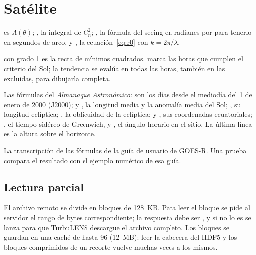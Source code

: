 \section{Satélite}


 es $\Lambda(\theta)$; , la integral de $C_n^2$; , la fórmula del seeing en
radianes por  para tenerlo en segundos de arco, y , la ecuación~\eqref{eq:r0} con $k = 2\pi/\lambda$.


 con grado 1 es la recta de mínimos cuadrados.  marca las horas que cumplen el criterio del
Sol; la tendencia se evalúa en todas las horas, también en las excluidas, para dibujarla completa.



Las fórmulas del \emph{Almanaque Astronómico}:  son los días desde el mediodía del 1 de enero de 2000 (J2000);
 y , la longitud media y la anomalía media del Sol; , su longitud eclíptica; ,
la oblicuidad de la eclíptica;  y , sus coordenadas ecuatoriales; , el tiempo sidéreo
de Greenwich, y , el ángulo horario en el sitio. La última línea es la altura sobre el horizonte.


La transcripción de las fórmulas de la guía de usuario de GOES-R. Una prueba compara el resultado con el ejemplo numérico
de esa guía.

\subsection*{Lectura parcial}\label{sec:codigo_rango}


El archivo remoto se divide en bloques de 128~KB. Para leer el bloque  se pide al servidor el rango de bytes
correspondiente; la respuesta debe ser , y si no lo es se lanza 
para que TurbuLENS descargue el archivo completo. Los bloques se guardan en una caché de hasta 96 (12~MB): leer la
cabecera del HDF5 y los bloques comprimidos de un recorte vuelve muchas veces a los mismos.

